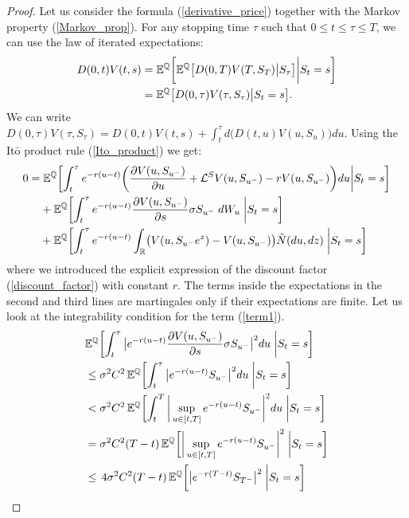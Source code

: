 \begin{proof}
 Let us consider the formula 
 (\ref{derivative_price}) together with the Markov property (\ref{Markov_prop}). 
 For any stopping time $\tau$ such that $0 \leq t \leq \tau \leq T$, we can use the law of iterated expectations:
 \begin{align*}
   D(0,t) V(t,s) &= \mathbb{E}^{\mathbb{Q}}  \biggl[ \mathbb{E}^{\mathbb{Q}} \bigl[ D(0,T) V(T,S_T) \big| S_{\tau} \bigr] \bigg| S_t=s \biggr] \\ 
                 &= \mathbb{E}^{\mathbb{Q}} \bigl[ D(0,\tau) V(\tau,S_{\tau}) \big| S_t=s \bigr]. 
 \end{align*}
 We can write $D(0,\tau) V(\tau,S_{\tau}) = D(0,t) V(t,s) + \int_t^{\tau} d\bigl(D(t,u) V(u,S_u)\bigr) du$. 
 Using the It\=o product rule (\ref{Ito_product}) we get:
 \begin{align}\label{proof_Cont_V}
  0 =& \; \mathbb{E}^{\mathbb{Q}} \biggl[ \int_t^{\tau} e^{-r(u-t)} \biggl( \frac{\partial V(u,S_{u^-})}{\partial u} + \mathcal{L}^{S} V(u,S_{u^-}) -r V(u,S_{u^-}) \biggr) du \bigg| S_t=s \biggr] \\ \label{term1}
     & + \mathbb{E}^{\mathbb{Q}} \biggl[ \int_t^{\tau} e^{-r(u-t)} \frac{\partial V(u,S_{u^-})}{\partial s} \sigma S_{u^-} \; dW_u \; \bigg| S_t=s \biggr] \\ \label{term2}
     & + \mathbb{E}^{\mathbb{Q}} \biggl[ \int_t^{\tau} e^{-r(u-t)} \int_{\mathbb{R}} \bigl( V(u,S_{u^-}e^z) - V(u,S_{u^-}) \bigr) \tilde N(du,dz) \; \bigg| S_t=s \biggr]
 \end{align}
 where we introduced the explicit expression of the discount factor (\ref{discount_factor}) with constant $r$.
 The terms inside the expectations in the second and third lines are martingales only if their expectations are finite.
 Let us look at the integrability condition for the term (\ref{term1}). 
 \begin{align*}
& \E^{\Q} \biggl[ \int_t^{\tau} \big| e^{-r(u-t)} \frac{\partial V(u,S_{u^-})}{\partial s} \sigma S_{u^-} \big|^2 du \; \bigg| S_t=s \biggr] \\
& \leq \sigma^2 C^2\, \E^{\Q} \biggl[ \int_t^{\tau} \big| e^{-r(u-t)} S_{u^-} \big|^2 du \; \bigg| S_t=s \biggr] \\
& < \sigma^2 C^2\, \E^{\Q} \biggl[ \int_t^{T} \bigg| \sup_{u\in [t,T]} e^{-r(u-t)} S_{u^-} \bigg|^2 du \; \bigg| S_t=s \biggr] \\
& = \sigma^2 C^2 (T-t)\, \E^{\Q} \biggl[ \bigg| \sup_{u\in [t,T]} e^{-r(u-t)} S_{u^-} \bigg|^2  \; \bigg| S_t=s \biggr] \\
& \leq \, 4 \sigma^2 C^2 (T-t)\, \E^{\Q} \biggl[ \big| e^{-r(T-t)} S_{T^-} \big|^2  \; \bigg| S_t=s \biggr] \\

\end{align*}
\end{proof}
